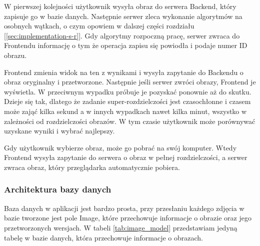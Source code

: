 W pierwszej kolejności użytkownik wysyła obraz do serwera Backend, który zapisuje go w bazie danych. Następnie serwer zleca wykonanie algorytmów na osobnych wątkach, o czym opowiem w dalszej części rozdziału [\ref{sec:implementation-s-r}]. Gdy algorytmy rozpoczną pracę, serwer zwraca do Frontendu informację o tym że operacja zapisu się powiodła i podaje numer ID obrazu. 

Frontend zmienia widok na ten z wynikami i wysyła zapytanie do Backendu o obraz oryginalny i przetworzone. Następnie jeśli serwer zwróci obrazy, Frontend je wyświetla. W przeciwnym wypadku próbuje je pozyskać ponownie aż do skutku. Dzieje się tak, dlatego że zadanie super-rozdzielczości jest czasochłonne i czasem może zająć kilka sekund a w innych wypadkach nawet kilka minut, wszystko w zależności od rozdzielczości obrazów. W tym czasie użytkownik może porównywać uzyskane wyniki i wybrać najlepszy. 

Gdy użytkownik wybierze obraz, może go pobrać na swój komputer. Wtedy Frontend wysyła zapytanie do serwera o obraz w pełnej rozdzielczości, a serwer zwraca obraz, który przeglądarka automatycznie pobiera.

\subsubsection*{Architektura bazy danych}

Baza danych w aplikacji jest bardzo prosta, przy przesłaniu każdego zdjęcia w bazie tworzone jest pole Image, które przechowuje informacje o obrazie oraz jego przetworzonych wersjach. W tabeli \ref{tab:image_model} przedstawiam jedyną tabelę w bazie danych, która przechowuje informacje o obrazach.

